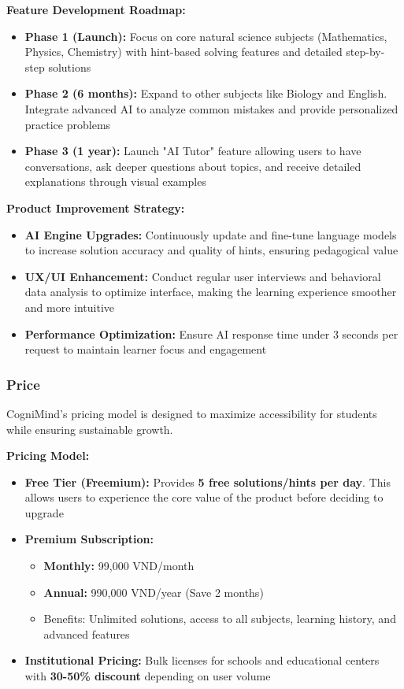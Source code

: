 \textbf{Feature Development Roadmap:}
\begin{itemize}
    \item \textbf{Phase 1 (Launch):} Focus on core natural science subjects (Mathematics, Physics, Chemistry) with hint-based solving features and detailed step-by-step solutions
    \item \textbf{Phase 2 (6 months):} Expand to other subjects like Biology and English. Integrate advanced AI to analyze common mistakes and provide personalized practice problems
    \item \textbf{Phase 3 (1 year):} Launch "AI Tutor" feature allowing users to have conversations, ask deeper questions about topics, and receive detailed explanations through visual examples
\end{itemize}

\textbf{Product Improvement Strategy:}
\begin{itemize}
    \item \textbf{AI Engine Upgrades:} Continuously update and fine-tune language models to increase solution accuracy and quality of hints, ensuring pedagogical value
    \item \textbf{UX/UI Enhancement:} Conduct regular user interviews and behavioral data analysis to optimize interface, making the learning experience smoother and more intuitive
    \item \textbf{Performance Optimization:} Ensure AI response time under 3 seconds per request to maintain learner focus and engagement
\end{itemize}

\subsubsection{Price}
CogniMind's pricing model is designed to maximize accessibility for students while ensuring sustainable growth.

\textbf{Pricing Model:}
\begin{itemize}
    \item \textbf{Free Tier (Freemium):} Provides \textbf{5 free solutions/hints per day}. This allows users to experience the core value of the product before deciding to upgrade
    \item \textbf{Premium Subscription:}
    \begin{itemize}
        \item \textbf{Monthly:} 99,000 VND/month
        \item \textbf{Annual:} 990,000 VND/year (Save 2 months)
        \item Benefits: Unlimited solutions, access to all subjects, learning history, and advanced features
    \end{itemize}
    \item \textbf{Institutional Pricing:} Bulk licenses for schools and educational centers with \textbf{30-50\% discount} depending on user volume
\end{itemize}

